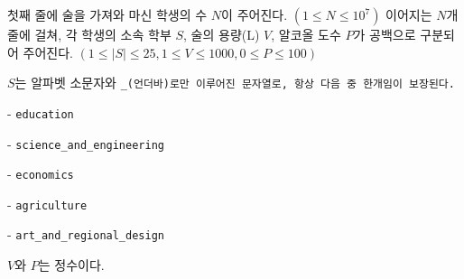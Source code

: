 첫째 줄에 술을 가져와 마신 학생의 수 $N$이 주어진다. $(1 \le N \le 10^7)$
이어지는 $N$개 줄에 걸쳐, 각 학생의 소속 학부 $S$, 술의 용량(L) $V$, 알코올 도수 $P$가 공백으로 구분되어 주어진다. $(1 \le |S| \le 25, 1 \le V \le 1000, 0 \le P \le 100)$

$S$는 알파벳 소문자와 \tt{_}(언더바)로만 이루어진 문자열로, 항상 다음 중 한개임이 보장된다.

- \tt{education}

- \tt{science_and_engineering}

- \tt{economics}

- \tt{agriculture}

- \tt{art_and_regional_design}

$V$와 $P$는 정수이다.